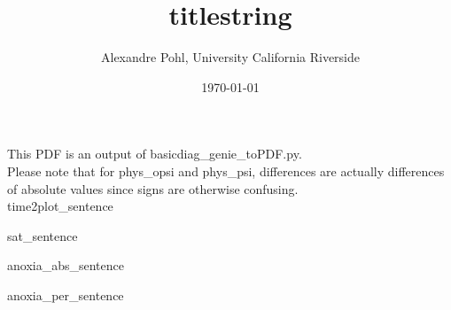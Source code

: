 \documentclass[a4paper,12pt]{scrartcl}
\begin{document}
\title{titlestring}
\author{Alexandre Pohl, University California Riverside}
\date{\today}
\maketitle

\listoffigures

\clearpage

This PDF is an output of basicdiag_genie_toPDF.py. \\ 


Please note that for phys_opsi and phys_psi, differences are actually differences of absolute values since signs are otherwise confusing. \\


time2plot_sentence


sat_sentence

anoxia_abs_sentence

anoxia_per_sentence

\clearpage

\end{document}
